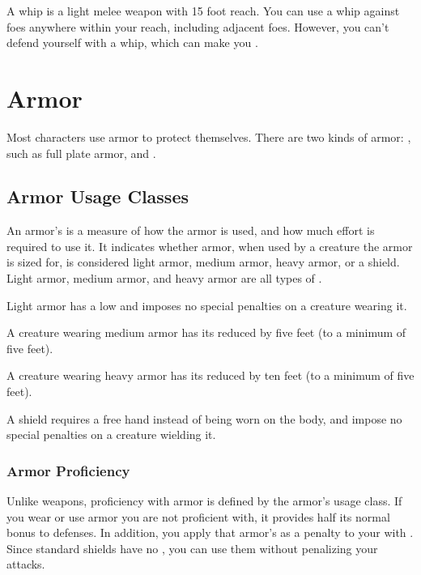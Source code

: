          A whip is a light melee weapon with 15 foot reach.
        You can use a whip against foes anywhere within your reach, including adjacent foes.
        However, you can't defend yourself with a whip, which can make you .

\section{Armor}\label{Armor}

    Most characters use armor to protect themselves. There are two kinds of armor: , such as full plate armor, and .

    \subsection{Armor Usage Classes}\label{Armor Usage Classes}
        An armor's  is a measure of how the armor is used, and how much effort is required to use it.
        It indicates whether armor, when used by a creature the armor is sized for, is considered light armor, medium armor, heavy armor, or a shield.
        Light armor, medium armor, and heavy armor are all types of .

         Light armor has a low  and imposes no special penalties on a creature wearing it.

         A creature wearing medium armor has its  reduced by five feet (to a minimum of five feet).

         A creature wearing heavy armor has its  reduced by ten feet (to a minimum of five feet).

         A shield requires a free hand instead of being worn on the body, and impose no special penalties on a creature wielding it.

        \subsubsection{Armor Proficiency}\label{Armor Proficiency}
            Unlike weapons, proficiency with armor is defined by the armor's usage class.
            If you wear or use armor you are not proficient with, it provides half its normal bonus to defenses.
            In addition, you apply that armor's  as a penalty to your  with .
            Since standard shields have no , you can use them without penalizing your attacks.

